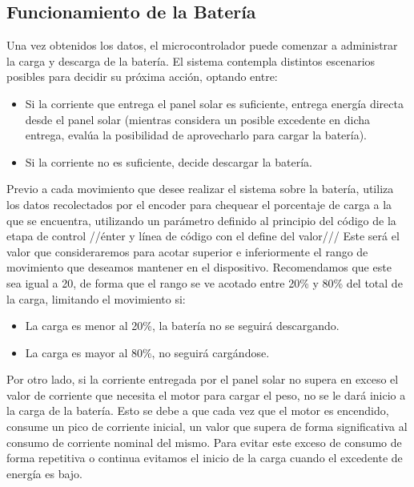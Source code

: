         \subsection{Funcionamiento de la Batería}
            Una vez obtenidos los datos, el microcontrolador puede comenzar a administrar la carga y descarga de la batería. El sistema contempla distintos escenarios posibles para decidir su próxima acción, optando entre:\par
            
            \begin{itemize} [label=•]
                \setlength{\itemindent}{1.5em}
                
                \item Si la corriente que entrega el panel solar es suficiente, entrega energía directa desde el panel solar (mientras considera un posible excedente en dicha entrega, evalúa la posibilidad de aprovecharlo para cargar la batería).
                \item Si la corriente no es suficiente, decide descargar la batería.
            \end{itemize}
            
            Previo a cada movimiento que desee realizar el sistema sobre la batería, utiliza los datos recolectados por el encoder para chequear el porcentaje de carga a la que se encuentra, utilizando un parámetro definido al principio del código de la etapa de control //énter y línea de código con el define del valor/// Este será el valor que consideraremos para acotar superior e inferiormente el rango de movimiento que deseamos mantener en el dispositivo. Recomendamos que este sea igual a 20, de forma que el rango se ve acotado entre 20\% y 80\% del total de la carga, limitando el movimiento si:\par
            
            \begin{itemize} [label=•]
                \setlength{\itemindent}{1.5em}
                
                \item La carga es menor al 20\%, la batería no se seguirá descargando.
                \item La carga es mayor al 80\%, no seguirá cargándose.
            \end{itemize}
            
            Por otro lado, si la corriente entregada por el panel solar no supera en exceso el valor de corriente que necesita el motor para cargar el peso, no se le dará inicio a la carga de la batería. Esto se debe a que cada vez que el motor es encendido, consume un pico de corriente inicial, un valor que supera de forma significativa al consumo de corriente nominal del mismo. Para evitar este exceso de consumo de forma repetitiva o continua evitamos el inicio de la carga cuando el excedente de energía es bajo.\par
